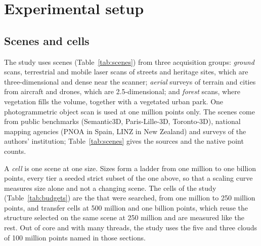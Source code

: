 \section{Experimental setup}\label{sec:setup}

\subsection{Scenes and cells}\label{sec:scenes}

The study uses \nScenes{} scenes (Table~\ref{tab:scenes}) from three acquisition groups: \emph{ground} scans, terrestrial and mobile laser scans of streets and heritage sites, which are three-dimensional and dense near the scanner; \emph{aerial} surveys of terrain and cities from aircraft and drones, which are 2.5-dimensional; and \emph{forest} scans, where vegetation fills the volume, together with a vegetated urban park. One photogrammetric object scan is used at one million points only. The scenes come from public benchmarks (Semantic3D, Paris-Lille-3D, Toronto-3D), national mapping agencies (PNOA in Spain, LINZ in New Zealand) and surveys of the authors' institution; Table~\ref{tab:scenes} gives the sources and the native point counts.

\begin{table}[t]
\centering\footnotesize
\caption{The scenes. Flatness is the score of Section~\ref{sec:rule} (a range where it varies with size); cells counts the sizes at which a scene appears, from one million to one billion points. Every cell is a seeded strict subset of the scene's native points, so no cell contains interpolated points.}
\label{tab:scenes}

\end{table}

A \emph{cell} is one scene at one size. Sizes form a ladder from one million to one billion points, every tier a seeded strict subset of the one above, so that a scaling curve measures size alone and not a changing scene. The \nCells{} cells of the study (Table~\ref{tab:budgets}) are the \nSearchedCells{} that were searched, from one million to 250 million points, and \nTransferCells{} transfer cells at 500 million and one billion points, which reuse the structure selected on the same scene at 250 million and are measured like the rest. Out of core and with many threads, the study uses the five and three clouds of 100 million points named in those sections.

\begin{table}[t]
\centering\footnotesize
\caption{Cells and budgets per size: the queries replayed from the held-out trace, and for the searched cells the genetic search's budget (variants per generation $\times$ generations $\times$ population). The grid of tuned single structures is the same 55 variants at every size.}
\label{tab:budgets}

\end{table}


